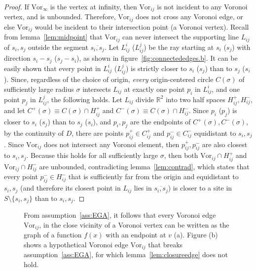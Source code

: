 \documentclass[11pt]{article}
\newcommand{\Vor}{\text{Vor}}
\begin{document}
\begin{proof}
If $\Vor_\infty$ is the vertex at infinity, then $\Vor_{ij}$ is not incident to any Voronoi vertex, and is unbounded. 
Therefore, $\Vor_{ij}$ does not cross any Voronoi edge, 
	or else $\Vor_{ij}$ would be incident to their intersection point (a Voronoi vertex). 
Recall from lemma~\ref{lem:midpoint} 
	that 	$\Vor_{ij}$ can never intersect the supporting line $L_{ij}$ of $s_i,s_j$ outside the segment $\overline{s_i,s_j}$. 
Let $L^i_{ij}$ ($L^j_{ij}$) be the ray starting at $s_i$ ($s_j$) with direction $s_i-s_j$ ($s_j-s_i$), 
as shown in figure~\ref{fig:connectededges.b}. 
It can be easily shown that every point in $L^i_{ij}$ ($L^j_{ij}$) is strictly closer to $s_i$ ($s_j$) than to $s_j$ ($s_i$). 
Since, regardless of the choice of origin, 
	\emph{every} origin-centered circle $C(\sigma)$ of sufficiently large radius $\sigma$ intersects $L_{ij}$ at 
	exactly one point $p_i$ in $L^i_{ij}$, and one point $p_j$ in $L^j_{ij}$,
	the following holds. 
Let $L_{ij}$ divide $\mathbb{R}^2$ into two half spaces $H^{+}_{ij},H^{-}_{ij}$, 
	and let $C^{+}(\sigma)\equiv C(\sigma)\cap H^{+}_{ij}$ and
		    $C^{-}(\sigma)\equiv C(\sigma)\cap H^{-}_{ij}$. 
Since $p_i$ ($p_j$) is closer to $s_i$ ($s_j$) than to $s_j$ ($s_i$), 
	and $p_i,p_j$ are the endpoints of $C^{+}(\sigma), C^{-}(\sigma)$, 
	by the continuity of $D$, 
	there are points $p^{+}_{ij}\in C^{+}_{ij}$ and $p^{-}_{ij}\in C^{-}_{ij}$ equidistant to $s_i,s_j$. 
Since $\Vor_{ij}$ does not intersect any Voronoi element, then $p^{+}_{ij},p^{-}_{ij}$ are also closest to $s_i,s_j$. 
Because this holds for all sufficiently large $\sigma$, 
	then both $\Vor_{ij}\cap H^{+}_{ij}$ and $\Vor_{ij}\cap H^{-}_{ij}$ are unbounded, 
	contradicting lemma~\ref{lem:contrad}, 
	which states that every point $p^{-}_{ij}\in H^{-}_{ij}$ that is sufficiently far from the origin
	and equidistant to $s_i,s_j$ (and therefore its closest point in $L_{ij}$ lies in $\overline{s_i,s_j}$) 
	is closer to a site in $S\setminus\{s_i,s_j\}$ than to $s_i,s_j$. 
\end{proof}






\begin{figure}[htbp]
   \centering
   	\quad\quad
\caption{From assumption~\ref{ass:EGA}, it follows that every Voronoi edge $\Vor_{ij}$, 
   			in the close vicinity of a Voronoi vertex can be written as the graph of a function $f(x)$ with an endpoint at $v$ (a). 
		Figure (b) shows a hypothetical Voronoi edge $\Vor_{ij}$ that breaks assumption~\ref{ass:EGA}, 
			for which lemma~\ref{lem:closureedge} does not hold. }
   \label{fig:closureedge}
\end{figure}
\end{document}
